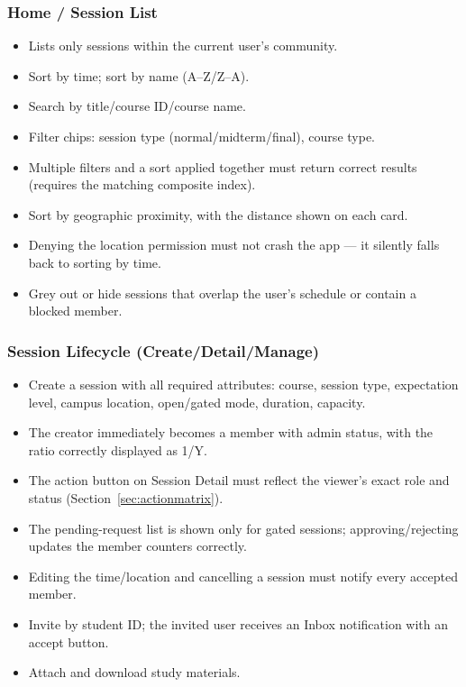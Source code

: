 \subsubsection{Home / Session List}
\begin{itemize}
    \item [M] Lists only sessions within the current user's community.
    \item [M] Sort by time; sort by name (A--Z/Z--A).
    \item [M] Search by title/course ID/course name.
    \item [M] Filter chips: session type (normal/midterm/final), course type.
    \item [M] Multiple filters and a sort applied together must return correct results (requires the matching composite index).
    \item [S] Sort by geographic proximity, with the distance shown on each card.
    \item [S] Denying the location permission must not crash the app — it silently falls back to sorting by time.
    \item [N] Grey out or hide sessions that overlap the user's schedule or contain a blocked member.
\end{itemize}

\subsubsection{Session Lifecycle (Create/Detail/Manage)}
\begin{itemize}
    \item [M] Create a session with all required attributes: course, session type, expectation level, campus location, open/gated mode, duration, capacity.
    \item [M] The creator immediately becomes a member with admin status, with the ratio correctly displayed as 1/Y.
    \item [M] The action button on Session Detail must reflect the viewer's exact role and status (Section~\ref{sec:actionmatrix}).
    \item [M] The pending-request list is shown only for gated sessions; approving/rejecting updates the member counters correctly.
    \item [M] Editing the time/location and cancelling a session must notify every accepted member.
    \item [S] Invite by student ID; the invited user receives an Inbox notification with an accept button.
    \item [S] Attach and download study materials.
\end{itemize}


